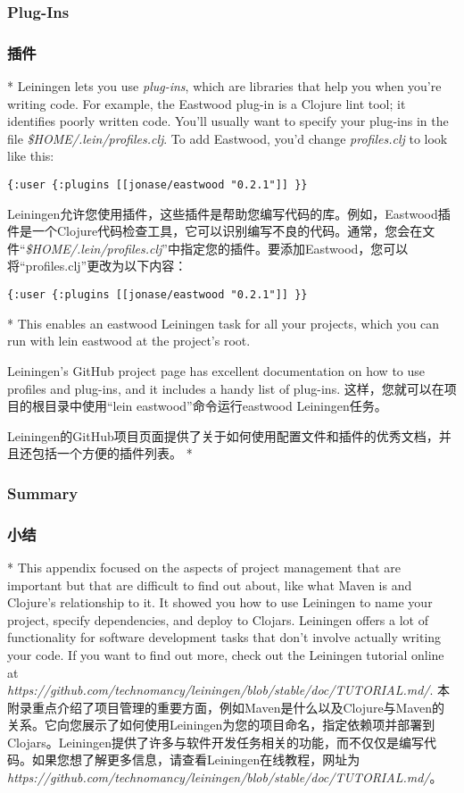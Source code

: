 \documentclass{book}
\begin{document}
\begin{paracol}{2}
\subsubsection{Plug-Ins}
\switchcolumn
\subsubsection{插件}
\switchcolumn[0]*
Leiningen lets you use \emph{plug-ins}, which are libraries that help
you when you're writing code. For example, the Eastwood plug-in is a
Clojure lint tool; it identifies poorly written code. You'll usually
want to specify your plug-ins in the file
\emph{\$HOME/.lein/profiles.clj}. To add Eastwood, you'd change
\emph{profiles.clj} to look like this:
\begin{verbatim}
{:user {:plugins [[jonase/eastwood "0.2.1"]] }}
\end{verbatim}
\switchcolumn
Leiningen允许您使用插件，这些插件是帮助您编写代码的库。例如，Eastwood插件是一个Clojure代码检查工具，它可以识别编写不良的代码。通常，您会在文件``\emph{\$HOME/.lein/profiles.clj}''中指定您的插件。要添加Eastwood，您可以将“profiles.clj”更改为以下内容：
\begin{verbatim}
{:user {:plugins [[jonase/eastwood "0.2.1"]] }}
\end{verbatim} 
\switchcolumn[0]*
This enables an eastwood Leiningen task for all your projects, which you
can run with lein eastwood at the project's root.

Leiningen's GitHub project page has excellent documentation on how to
use profiles and plug-ins, and it includes a handy list of plug-ins.
\switchcolumn
这样，您就可以在项目的根目录中使用“lein eastwood”命令运行eastwood Leiningen任务。

Leiningen的GitHub项目页面提供了关于如何使用配置文件和插件的优秀文档，并且还包括一个方便的插件列表。
\switchcolumn[0]*
\subsubsection{Summary}
\switchcolumn
\subsubsection{小结}
\switchcolumn[0]*
This appendix focused on the aspects of project management that are
important but that are difficult to find out about, like what Maven is
and Clojure's relationship to it. It showed you how to use Leiningen to
name your project, specify dependencies, and deploy to Clojars.
Leiningen offers a lot of functionality for software development tasks
that don't involve actually writing your code. If you want to find out
more, check out the Leiningen tutorial online at\\
\emph{https://github.com/technomancy/leiningen/blob/stable/doc/TUTORIAL.md/}.
\switchcolumn
本附录重点介绍了项目管理的重要方面，例如Maven是什么以及Clojure与Maven的关系。它向您展示了如何使用Leiningen为您的项目命名，指定依赖项并部署到Clojars。Leiningen提供了许多与软件开发任务相关的功能，而不仅仅是编写代码。如果您想了解更多信息，请查看Leiningen在线教程，网址为\\
\emph{https://github.com/technomancy/leiningen/blob/stable/doc/TUTORIAL.md/}。
\end{paracol}
\end{document}
